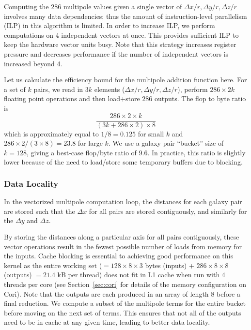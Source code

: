 Computing the 286 multipole values given a single vector of $\Delta x/r, \Delta y/r, \Delta z/r$ involves many data dependencies; thus the amount of instruction-level parallelism (ILP) in this algorithm is limited.
In order to increase ILP, we perform computations on 4 independent vectors at once. 
This provides sufficient ILP to keep the hardware vector units busy. 
Note that this strategy increases register pressure and decreases performance if the number of independent vectors is increased beyond 4. 

Let us calculate the efficiency bound for the multipole addition function here.
For a set of $k$ pairs, we read in $3k$ elements ($\Delta x/r, \Delta y/r, \Delta z/r$), perform $286 \times 2k$ floating point operations and then load+store $286$ outputs. 
The flop to byte ratio is
\begin{equation*}
\frac{286\times 2 \times k}{(3k+286\times2)\times 8}
\end{equation*}
which is approximately equal to $1/8=0.125$ for small $k$ and $286\times 2/(3\times 8)=23.8$ for large $k$. 
We use a galaxy pair ``bucket'' size of $k=128$, giving a best-case flop/byte ratio of $9.6$. In practice, this ratio is slightly lower because of the need to load/store some temporary buffers due to blocking.


\subsubsection{Data Locality}

In the vectorized multipole computation loop, the distances for each galaxy pair are stored such that the $\Delta x$ for all pairs are stored contiguously, and similarly for the $\Delta y$ and $\Delta z$.

By storing the distances along a particular axis for all pairs contiguously, these vector operations result in the fewest possible number of loads from memory for the inputs.
Cache blocking is essential to achieving good performance on this kernel as the entire working set ($=128\times 8\times 3$ bytes (inputs) + $286\times 8\times 8$ (outputs) $= 21.4$ kB per thread) does not fit in L1 cache when run with 4 threads per core (see Section~\ref{sec:cori} for details of the memory configuration on Cori). Note that the outputs are each produced in an array of length 8 before a final reduction.
We compute a subset of the multipole terms for the entire bucket before moving on the next set of terms. This ensures that not all of the outputs need to be in cache at any given time, leading to better data locality.



